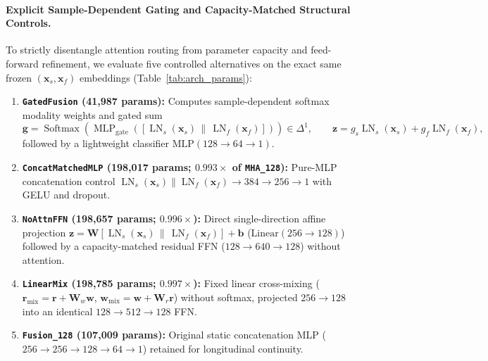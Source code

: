 \documentclass[fleqn,10pt]{wlscirep}
\begin{document}
\paragraph{Explicit Sample-Dependent Gating and Capacity-Matched Structural Controls.}
To strictly disentangle attention routing from parameter capacity and feed-forward refinement, we evaluate five controlled alternatives on the exact same frozen $(\mathbf{x}_s, \mathbf{x}_f)$ embeddings (Table~\ref{tab:arch_params}):
\begin{enumerate}
    \item \textbf{\texttt{GatedFusion} (41,987 params):} Computes sample-dependent softmax modality weights and gated sum
    \[\mathbf{g} = \operatorname{Softmax}\!\left(\operatorname{MLP}_{\text{gate}}\!\left([\operatorname{LN}_s(\mathbf{x}_s)\,\|\,\operatorname{LN}_f(\mathbf{x}_f)]\right)\right) \in \Delta^1, \qquad \mathbf{z} = g_s \operatorname{LN}_s(\mathbf{x}_s) + g_f \operatorname{LN}_f(\mathbf{x}_f),\]
    followed by a lightweight classifier $\text{MLP}(128 \to 64 \to 1)$.
    \item \textbf{\texttt{ConcatMatchedMLP} (198,017 params; $0.993\times$ of \texttt{MHA\_128}):} Pure-MLP concatenation control $\operatorname{LN}_s(\mathbf{x}_s)\|\operatorname{LN}_f(\mathbf{x}_f) \to 384 \to 256 \to 1$ with GELU and dropout.
    \item \textbf{\texttt{NoAttnFFN} (198,657 params; $0.996\times$):} Direct single-direction affine projection $\mathbf{z} = \mathbf{W}[\operatorname{LN}_s(\mathbf{x}_s)\,\|\,\operatorname{LN}_f(\mathbf{x}_f)] + \mathbf{b}$ ($\text{Linear}(256\to 128)$) followed by a capacity-matched residual FFN ($128 \to 640 \to 128$) without attention.
    \item \textbf{\texttt{LinearMix} (198,785 params; $0.997\times$):} Fixed linear cross-mixing ($\mathbf{r}_{\text{mix}} = \mathbf{r} + \mathbf{W}_w \mathbf{w}$, $\mathbf{w}_{\text{mix}} = \mathbf{w} + \mathbf{W}_r \mathbf{r}$) without softmax, projected $256 \to 128$ into an identical $128 \to 512 \to 128$ FFN.
    \item \textbf{\texttt{Fusion\_128} (107,009 params):} Original static concatenation MLP ($256 \to 256 \to 128 \to 64 \to 1$) retained for longitudinal continuity.
\end{enumerate}
\end{document}
